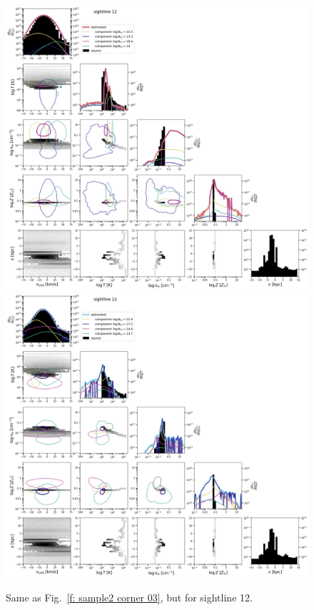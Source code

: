 \documentclass[fleqn,usenatbib]{mnras}
\begin{document}
\begin{figure}
    \centering
    \includegraphics[height=0.45\textheight]{figures/sample2/original/sightline_0012.png}
    \includegraphics[height=0.45\textheight]{figures/sample2/high-z/sightline_0012.png}
    \label{f: sample2 12 corner}
    \caption{Same as Fig.~\ref{f: sample2 corner 03}, but for sightline 12.}
\end{figure}
\end{document}
